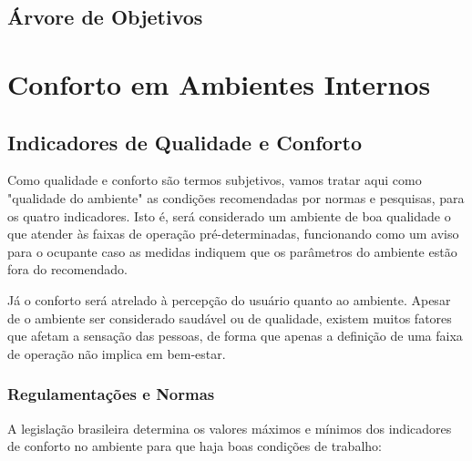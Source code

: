 \documentclass[]{politex}
\begin{document}
\chapter{Árvore de Objetivos} 

\part{Conforto em Ambientes Internos} %

\chapter{Indicadores de Qualidade e Conforto} %


Como qualidade e conforto são termos subjetivos, vamos tratar aqui como "qualidade do ambiente" as condições recomendadas por normas e pesquisas, para os quatro indicadores. Isto é, será considerado um ambiente de boa qualidade o que atender às faixas de operação pré-determinadas, funcionando como um aviso para o ocupante caso as medidas indiquem que os parâmetros do ambiente estão fora do recomendado. 

Já o conforto será atrelado à percepção do usuário quanto ao ambiente. Apesar de o ambiente ser considerado saudável ou de qualidade, existem muitos fatores que afetam a sensação das pessoas, de forma que apenas a definição de uma faixa de operação não implica em bem-estar. 

\section{Regulamentações e Normas}

A legislação brasileira determina os valores máximos e mínimos dos indicadores de conforto no ambiente para que haja boas condições de trabalho: 
\end{document}
